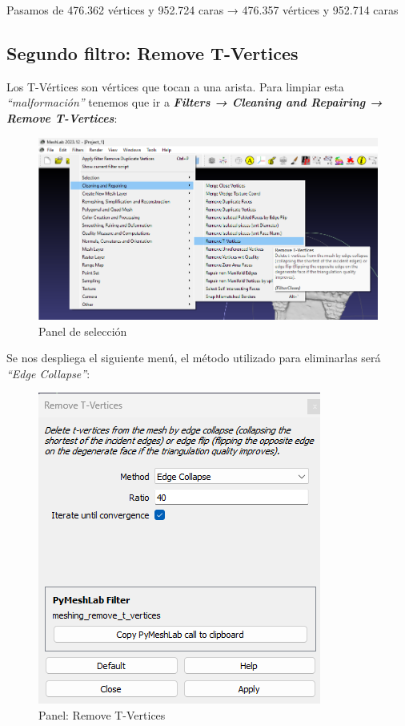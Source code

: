 \documentclass{article}
\begin{document}
Pasamos de 476.362 vértices y 952.724 caras → 476.357 vértices y 952.714 caras

\subsection{Segundo filtro: Remove T-Vertices}

Los T-Vértices son vértices que tocan a una arista. Para limpiar esta \textit{``malformación''} tenemos que ir a \textbf{\textit{Filters → Cleaning and Repairing → Remove T-Vertices}}:

\begin{figure}[H]
    \centering
    \includegraphics[scale=0.34]{images/filtro_04.png}
    \caption{Panel de selección}
\end{figure}

Se nos despliega el siguiente menú, el método utilizado para eliminarlas será \textit{``Edge Collapse''}:
\begin{figure}[H]
    \centering
    \includegraphics[scale=0.65]{images/filtro_05.png}
    \caption{Panel: Remove T-Vertices}
\end{figure}
\end{document}
